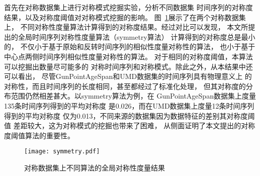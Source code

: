 首先在对称数据集上进行对称模式挖掘实验，分析不同数据集
时间序列的对称度结果，以及对称度阈值对对称模式挖掘的影响。
图~\ref{fig:symmetry_compare}展示了在两个对称数据集上，
不同对称性度量算法计算得到的对称度结果。经过对比可以发现，
本文所提出的全局时间序列对称性度量算法（symmetry算法）
计算得到的对称度总是最小的，
不仅小于基于原始和反转时间序列的相似性度量对称性的算法，
也小于基于中心点两侧时间序列相似性度量对称性的算法。
对于相同的对称度阈值，本算法可以挖掘出数量尽可能多的
对称时间序列和对称模式。除此之外，从本结果中还可以看出，
尽管GunPointAgeSpan和UMD数据集的时间序列具有物理意义上
的对称性，而且时间序列的长度相同，甚至都经过了标准化处理，
但其对称度的分布范围仍然相差甚大。以symmetry算法为例，在
GunPointAgeSpan数据集上度量135条时间序列得到的平均对称度
是0.026，而在UMD数据集上度量12条时间序列得到的平均对称度
仅为0.013，不同来源的数据集因为数据特征的差别其对称度阈值
差距较大，这为对称模式的挖掘也带来了困难，
从侧面证明了本文提出的对称度阈值算法的重要性。
\begin{figure}
  \centering
  \texttt{[image: symmetry.pdf]}
  \caption{对称数据集上不同算法的全局对称性度量结果}
  \label{fig:symmetry_compare}
\end{figure}

